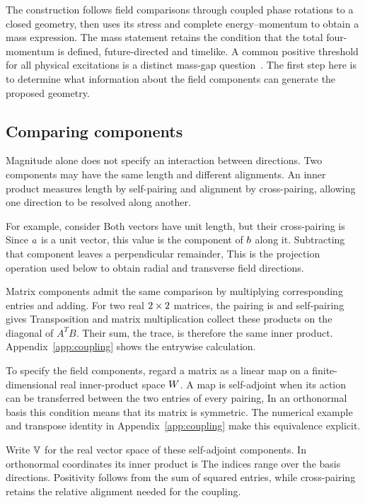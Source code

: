 The construction follows field comparisons through coupled phase rotations to a closed geometry, then uses its stress and complete energy--momentum to obtain a mass expression. The mass statement retains the condition that the total four-momentum is defined, future-directed and timelike. A common positive threshold for all physical excitations is a distinct mass-gap question~\cite{jaffeWitten}. The first step here is to determine what information about the field components can generate the proposed geometry.

\subsection{Comparing components}
Magnitude alone does not specify an interaction between directions. Two components may have the same length and different alignments. An inner product measures length by self-pairing and alignment by cross-pairing, allowing one direction to be resolved along another.

For example, consider
\FieldExampleVectorsDisplay
Both vectors have unit length,
\FieldExampleLengthsDisplay
but their cross-pairing is
\FieldExampleAlignmentDisplay
Since $a$ is a unit vector, this value is the component of $b$ along it. Subtracting that component leaves a perpendicular remainder,
\FieldExampleProjectionDisplay
This is the projection operation used below to obtain radial and transverse field directions.

Matrix components admit the same comparison by multiplying corresponding entries and adding. For two real $2\times2$ matrices,
\FieldExampleMatricesDisplay
the pairing is
\FieldExampleMatrixComparisonDisplay
and self-pairing gives
\FieldExampleMatrixLengthDisplay
Transposition and matrix multiplication collect these products on the diagonal of $A^TB$. Their sum, the trace, is therefore the same inner product. Appendix~\ref{app:coupling} shows the entrywise calculation.

To specify the field components, regard a matrix as a linear map on a finite-dimensional real inner-product space $W$. A map is self-adjoint when its action can be transferred between the two entries of every pairing,
\FieldSelfAdjointDisplay
In an orthonormal basis this condition means that its matrix is symmetric. The numerical example and transpose identity in Appendix~\ref{app:coupling} make this equivalence explicit.

Write $\mathbb V$ for the real vector space of these self-adjoint components. In orthonormal coordinates its inner product is
\FieldMatrixPairingDisplay
The indices range over the basis directions. Positivity follows from the sum of squared entries, while cross-pairing retains the relative alignment needed for the coupling.


